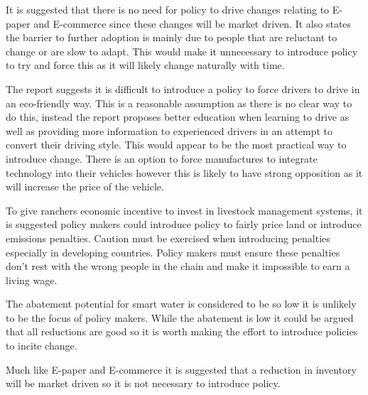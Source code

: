 It is suggested that there is no need for policy to drive changes relating to E-paper and E-commerce since these changes will be market driven. It also states the barrier to further adoption is mainly due to people that are reluctant to change or are slow to adapt. This would make it unnecessary to introduce policy to try and force this as it will likely change naturally with time.

The report suggests it is difficult to introduce a policy to force drivers to drive in an eco-friendly way. This is a reasonable assumption as there is no clear way to do this, instead the report proposes better education when learning to drive as well as providing more information to experienced drivers in an attempt to convert their driving style. This would appear to be the most practical way to introduce change.  There is an option to force manufactures to integrate technology into their vehicles however this is likely to have strong opposition as it will increase the price of the vehicle.

To give ranchers economic incentive to invest in livestock management systems, it is suggested policy makers could introduce policy to fairly price land or introduce emissions penalties. Caution must be exercised when introducing penalties especially in developing countries. Policy makers must ensure these penalties don’t rest with the wrong people in the chain and make it impossible to earn a living wage.

The abatement potential for smart water is considered to be so low it is unlikely to be the focus of policy makers. While the abatement is low it could be argued that all reductions are good so it is worth making the effort to introduce policies to incite change. 

Much like E-paper and E-commerce it is suggested that a reduction in inventory will be market driven so it is not necessary to introduce policy. 

